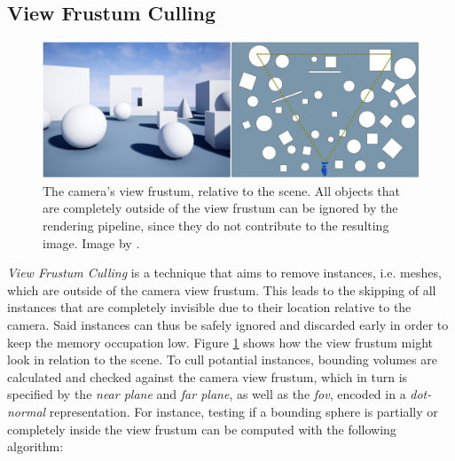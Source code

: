 \subsection{View Frustum Culling} \label{subsec-view-frustum-culling}

\begin{figure}[h]
    \centering
    \includegraphics[width=\linewidth]{images/graphics/view-frustum-culling.png}
    \caption{The camera's view frustum, relative to the scene. All objects that are completely outside of 
    the view frustum can be ignored by the rendering pipeline, since they do not contribute to the resulting image.
    Image by \cite{Pan2020}.}
    \label{fig:view-frustum-culling}
\end{figure}

\noindent
\emph{View Frustum Culling} is a technique that aims to remove instances, i.e. meshes, which are outside of the camera 
view frustum. This leads to the skipping of all instances that are completely invisible due to their location relative to 
the camera. Said instances can thus be safely ignored and discarded early in order to keep the memory occupation low. 
Figure \ref{fig:view-frustum-culling} shows how the view frustum might look in relation to the scene. 
To cull potantial instances, bounding volumes are calculated and checked against the camera view frustum, which in turn 
is specified by the \emph{near plane} and \emph{far plane}, as well as the \emph{fov}, encoded in a \emph{dot-normal}
representation. For instance, testing if a bounding sphere is partially or completely inside the view frustum can be 
computed with the following algorithm: \\

    
